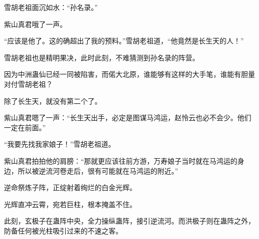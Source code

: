 \begin{this_body}
雪胡老祖面沉如水：“孙名录。”

紫山真君哦了一声。

“应该是他了。这的确超出了我的预料。”雪胡老祖道，“他竟然是长生天的人！”

雪胡老祖也是精明果决，此时此刻，不难猜测到孙名录的阵营。

因为中洲蛊仙已经一同被陷害，而偌大北原，谁能够有这样的大手笔，谁能有胆量对付雪胡老祖？

除了长生天，就没有第二个了。

紫山真君嗯了一声：“长生天出手，必定是图谋马鸿运，赵怜云也必不会少。他们一定在前面。”

“我要先找我家娘子！”雪胡老祖道。

紫山真君拍拍他的肩膀：“那就更应该往前方游，万寿娘子当时就在马鸿运的身边，所以被逆流河卷走后，很有可能就在马鸿运的附近。”

逆命祭炼子阵，正绽射着绚烂的白金光辉。

光辉直冲云霄，宛若巨柱，根本掩盖不住。

此刻，玄极子在蛊阵中央，全力操纵蛊阵，接引逆流河。而洪极子则在蛊阵之外，防备任何被光柱吸引过来的不速之客。

\end{this_body}

